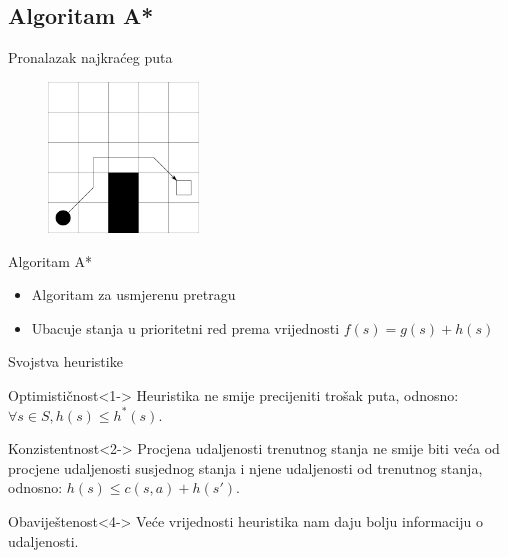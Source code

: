 \documentclass[utf8]{beamer}
\begin{document}
\subsection{Algoritam A*}

\begin{frame}{Pronalazak najkraćeg puta}
    \begin{figure}[h] 
        \centering
        \includegraphics[height=4cm]{images/basicGrid.pdf}
    \end{figure} 
\end{frame}

\begin{frame}{Algoritam A*}
    \begin{itemize}
        \item Algoritam za usmjerenu pretragu
        \item Ubacuje stanja u prioritetni red prema vrijednosti \(f(s) = g(s) + h(s)\)
    \end{itemize}
\end{frame}

\begin{frame}{Svojstva heuristike}
    \begin{block}{Optimističnost}<1->
        Heuristika ne smije precijeniti trošak puta, odnosno:
        \(\forall s \in S, h(s) \leq h^*(s)\).
    \end{block}
  
    \begin{block}{Konzistentnost}<2->
        Procjena udaljenosti trenutnog stanja ne smije biti veća od procjene udaljenosti susjednog stanja i njene udaljenosti od trenutnog stanja, odnosno:
        \(h(s) \leq c(s, a) + h(s')\).
    \end{block}


    \begin{block}{Obaviještenost}<4->
        Veće vrijednosti heuristika nam daju bolju informaciju o udaljenosti.
    \end{block}
\end{frame}
\end{document}
